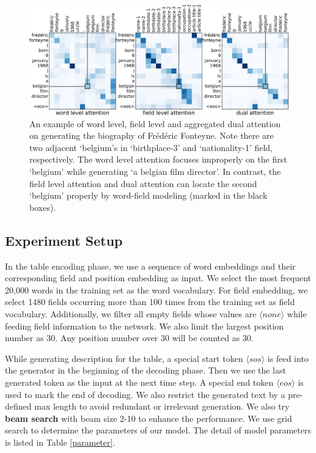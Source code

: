\documentclass[letterpaper]{article} %
\begin{document}
\begin{figure}[ht]
\centering
\includegraphics[width=0.95\linewidth]{sample}
\caption{An example of word level, field level and aggregated dual attention on generating the biography of Fr\'ed\'eric Fonteyne. Note there are two adjacent `belgium's in `birthplace-3' and  `nationality-1' field, respectively. The word level attention focuses improperly on the first `belgium' while generating `a belgian film director'. In contrast, the field level attention and dual attention can locate the second `belgium' properly by word-field modeling (marked in the black boxes).}\label{attshow}
\end{figure}



\subsection{Experiment Setup}
In the table encoding phase, we use a sequence of word embeddings and their corresponding field and position embedding as input.
We select the most frequent 20,000 words in the training set as the word vocabulary. 
For field embedding, we select 1480 fields occurring more than 100 times from the training set as field vocabulary. Additionally, we filter all empty fields whose values are \textit{$\langle none \rangle$} while feeding field information to the network. 
We also limit the largest position number as 30. Any position number over 30 will be counted as 30.   

While generating description for the table, a special start token \textit{$\langle sos \rangle$} is feed into the generator in the beginning of the decoding phase. Then we use the last generated token as the input at the next time step.
A special end token \textit{$\langle eos \rangle$} is used to mark the end of decoding. We also restrict the generated text by a pre-defined max length to avoid redundant or irrelevant generation.
We also try \textbf{beam search} with beam size 2-10 to enhance the performance. 
We use grid search to determine the parameters of our model. The detail of model parameters is listed in Table \ref{parameter}.   
\end{document}
